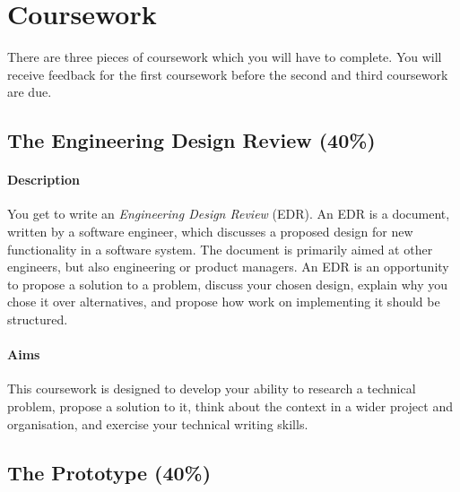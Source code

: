 
\section{Coursework}

There are three pieces of coursework which you will have to complete. You will receive feedback for the first coursework before the second and third coursework are due.

\subsection{The Engineering Design Review (40\%)}

\paragraph{Description} You get to write an \emph{Engineering Design Review} (EDR). An EDR is a document, written by a software engineer, which discusses a proposed design for new functionality in a software system. The document is primarily aimed at other engineers, but also engineering or product managers. An EDR is an opportunity to propose a solution to a problem, discuss your chosen design, explain why you chose it over alternatives, and propose how work on implementing it should be structured.

\paragraph{Aims} This coursework is designed to develop your ability to research a technical problem, propose a solution to it, think about the context in a wider project and organisation, and exercise your technical writing skills.

\subsection{The Prototype (40\%)}

